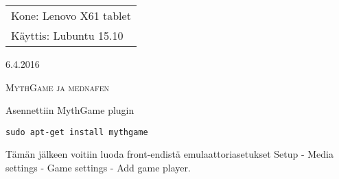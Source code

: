 \documentclass[main.tex]{subfiles}
\begin{document}
\thispagestyle{empty}
\begin{tabular}[t]{l}
Kone: Lenovo X61 tablet\\
Käyttis: Lubuntu 15.10
\end{tabular}
\hfill 6.4.2016

{\scshape\Large{MythGame ja mednafen}}

Asennettiin MythGame plugin

\begin{lstlisting}
sudo apt-get install mythgame
\end{lstlisting}

Tämän jälkeen voitiin luoda front-endistä emulaattoriasetukset Setup - Media settings - Game settings - Add game player.
\end{document}
